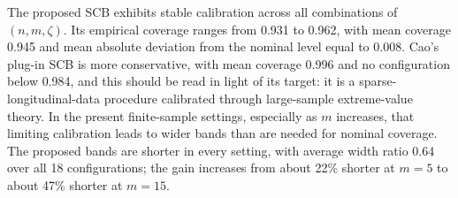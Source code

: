\begin{table}[t!]
\caption{Part 1, \(n=300\): empirical simultaneous coverage and average band
width for \(\beta_1\). The width ratio is the average width of the proposed
band divided by that of Cao's band.}
\label{tab:part1-300}\par
{}
\end{table}

The proposed SCB exhibits stable calibration across all combinations of
\((n,m,\zeta)\). Its empirical coverage ranges from 0.931 to 0.962, with mean
coverage 0.945 and mean absolute deviation from the nominal level equal to
0.008. Cao's plug-in SCB is more conservative, with mean coverage 0.996 and
no configuration below 0.984, and this should be read in light of its target:
it is a sparse-longitudinal-data procedure calibrated through large-sample
extreme-value theory. In the present finite-sample settings, especially as
\(m\) increases, that limiting calibration leads to wider bands than are
needed for nominal coverage. The proposed bands are shorter in every setting,
with average width ratio 0.64 over all 18 configurations; the gain increases
from about 22\% shorter at \(m=5\) to about 47\% shorter at \(m=15\).

